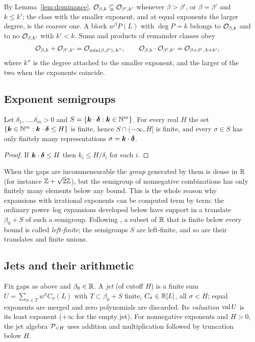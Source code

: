 By Lemma~\ref{lem:dominance}, $\mathcal O_{\beta,k}\subseteq\mathcal O_{\beta',k'}$ whenever $\beta>\beta'$, or $\beta=\beta'$ and $k\le k'$; the class with the smaller exponent, and at equal exponents the larger degree, is the coarser one. A block $w^\beta P(L)$ with $\deg P=k$ belongs to $\mathcal O_{\beta,k}$ and to no $\mathcal O_{\beta,k'}$ with $k'<k$. Sums and products of remainder classes obey
\begin{equation}
 \mathcal O_{\beta,k}+\mathcal O_{\beta',k'}=\mathcal O_{\min(\beta,\beta'),\,k''},\qquad
 \mathcal O_{\beta,k}\cdot\mathcal O_{\beta',k'}=\mathcal O_{\beta+\beta',\,k+k'},
 \label{eq:O-arithmetic}
\end{equation}
where $k''$ is the degree attached to the smaller exponent, and the larger of the two when the exponents coincide.

\subsection{Exponent semigroups}

\begin{lemma}
\label{lem:finite}
Let $\delta_1,\dots,\delta_m>0$ and $S=\{\boldsymbol k\cdot\boldsymbol\delta:\boldsymbol k\in\mathbb N^m\}$. For every real $H$ the set $\{\boldsymbol k\in\mathbb N^m:\boldsymbol k\cdot\boldsymbol\delta\le H\}$ is finite, hence $S\cap(-\infty,H]$ is finite, and every $\sigma\in S$ has only finitely many representations $\sigma=\boldsymbol k\cdot\boldsymbol\delta$.
\end{lemma}
\begin{proof}
If $\boldsymbol k\cdot\boldsymbol\delta\le H$ then $k_i\le H/\delta_i$ for each $i$.
\end{proof}

When the gaps are incommensurable the \emph{group} generated by them is dense in $\mathbb R$ (for instance $\mathbb Z+\sqrt2\mathbb Z$), but the semigroup of nonnegative combinations has only finitely many elements below any bound. This is the whole reason why expansions with irrational exponents can be computed term by term: the ordinary power--log expansions developed below have support in a translate $\beta_0+S$ of such a semigroup. Following \cite{proveit}, a subset of $\mathbb R$ that is finite below every bound is called \emph{left-finite}; the semigroups $S$ are left-finite, and so are their translates and finite unions.

\subsection{Jets and their arithmetic}

\begin{definition}[Jets]
Fix gaps as above and $\beta_0\in\mathbb R$. A \emph{jet} (of cutoff $H$) is a finite sum $U=\sum_{\sigma\in T}w^\sigma C_\sigma(L)$ with $T\subset\beta_0+S$ finite, $C_\sigma\in\mathbb R[L]$, all $\sigma<H$; equal exponents are merged and zero polynomials are discarded. Its \emph{valuation} $\operatorname{val} U$ is its least exponent ($+\infty$ for the empty jet). For nonnegative exponents and $H>0$, the jet algebra $\mathcal P_{<H}$ uses addition and multiplication followed by truncation below $H$.
\end{definition}

